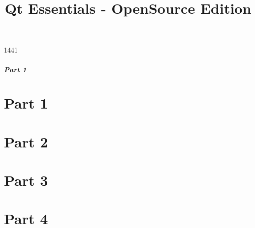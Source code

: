 \documentclass[t]{beamer}
\title{Qt Essentials - OpenSource Edition}
\begin{document}


\begin{slide}{1441}
  \frametitle{Part 1}
  \tableofcontents[part=1]
\end{slide}

\part{Part 1}




\part{Part 2}




\part{Part 3}


% 


\part{Part 4}



\end{document}
